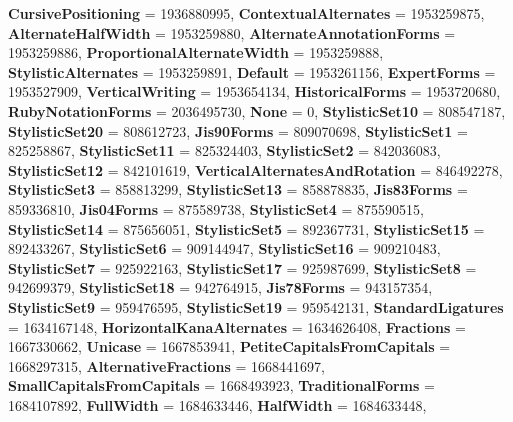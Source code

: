 \begin{DoxyCompactItemize}
{\bfseries Cursive\+Positioning} = 1936880995, 
{\bfseries Contextual\+Alternates} = 1953259875, 
{\bfseries Alternate\+Half\+Width} = 1953259880, 
\newline
{\bfseries Alternate\+Annotation\+Forms} = 1953259886, 
{\bfseries Proportional\+Alternate\+Width} = 1953259888, 
{\bfseries Stylistic\+Alternates} = 1953259891, 
{\bfseries Default} = 1953261156, 
\newline
{\bfseries Expert\+Forms} = 1953527909, 
{\bfseries Vertical\+Writing} = 1953654134, 
{\bfseries Historical\+Forms} = 1953720680, 
{\bfseries Ruby\+Notation\+Forms} = 2036495730, 
\newline
{\bfseries None} = 0, 
{\bfseries Stylistic\+Set10} = 808547187, 
{\bfseries Stylistic\+Set20} = 808612723, 
{\bfseries Jis90\+Forms} = 809070698, 
\newline
{\bfseries Stylistic\+Set1} = 825258867, 
{\bfseries Stylistic\+Set11} = 825324403, 
{\bfseries Stylistic\+Set2} = 842036083, 
{\bfseries Stylistic\+Set12} = 842101619, 
\newline
{\bfseries Vertical\+Alternates\+And\+Rotation} = 846492278, 
{\bfseries Stylistic\+Set3} = 858813299, 
{\bfseries Stylistic\+Set13} = 858878835, 
{\bfseries Jis83\+Forms} = 859336810, 
\newline
{\bfseries Jis04\+Forms} = 875589738, 
{\bfseries Stylistic\+Set4} = 875590515, 
{\bfseries Stylistic\+Set14} = 875656051, 
{\bfseries Stylistic\+Set5} = 892367731, 
\newline
{\bfseries Stylistic\+Set15} = 892433267, 
{\bfseries Stylistic\+Set6} = 909144947, 
{\bfseries Stylistic\+Set16} = 909210483, 
{\bfseries Stylistic\+Set7} = 925922163, 
\newline
{\bfseries Stylistic\+Set17} = 925987699, 
{\bfseries Stylistic\+Set8} = 942699379, 
{\bfseries Stylistic\+Set18} = 942764915, 
{\bfseries Jis78\+Forms} = 943157354, 
\newline
{\bfseries Stylistic\+Set9} = 959476595, 
{\bfseries Stylistic\+Set19} = 959542131, 
{\bfseries Standard\+Ligatures} = 1634167148, 
{\bfseries Horizontal\+Kana\+Alternates} = 1634626408, 
\newline
{\bfseries Fractions} = 1667330662, 
{\bfseries Unicase} = 1667853941, 
{\bfseries Petite\+Capitals\+From\+Capitals} = 1668297315, 
{\bfseries Alternative\+Fractions} = 1668441697, 
\newline
{\bfseries Small\+Capitals\+From\+Capitals} = 1668493923, 
{\bfseries Traditional\+Forms} = 1684107892, 
{\bfseries Full\+Width} = 1684633446, 
{\bfseries Half\+Width} = 1684633448, 

\end{DoxyCompactItemize}
